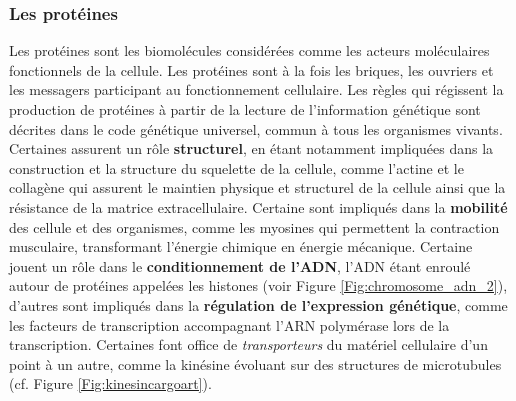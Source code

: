 
\subsubsection{Les protéines}


Les protéines sont les biomolécules considérées comme les acteurs moléculaires fonctionnels de la cellule. Les protéines sont à la fois les briques, les ouvriers et les messagers participant au fonctionnement cellulaire. Les règles qui régissent la production de protéines à partir de la lecture de l'information génétique sont décrites dans le code génétique universel, commun à tous les organismes vivants. Certaines assurent un rôle \textbf{structurel}, en étant notamment impliquées dans la construction et la structure du squelette de la cellule, comme l'actine et le collagène qui assurent le maintien physique et structurel de la cellule ainsi que la résistance de la matrice extracellulaire. Certaine sont impliqués dans la \textbf{mobilité} des cellule et des organismes, comme les myosines qui permettent la contraction musculaire, transformant l'énergie chimique en énergie mécanique. Certaine jouent un rôle dans le \textbf{conditionnement de l'ADN}, l'ADN étant enroulé autour de protéines appelées les histones (voir Figure \ref{Fig:chromosome_adn_2}), d'autres sont impliqués dans la \textbf{régulation de l'expression génétique}, comme les facteurs de transcription accompagnant l'ARN polymérase lors de la transcription. Certaines font office de \textit{transporteurs} du matériel cellulaire d'un point à un autre, comme la kinésine évoluant sur des structures de microtubules (cf. Figure \ref{Fig:kinesincargoart}).

